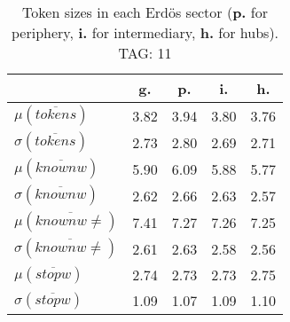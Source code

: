 \begin{table}[h!]
\begin{center}
\begin{tabular}{| l | c | c | c | c |}\hline
 & g. & p. & i. & h. \\\hline
$\mu(\overline{tokens})$ & 3.82  & 3.94  & 3.80  & 3.76 \\\hline
$\sigma(\overline{tokens})$ & 2.73  & 2.80  & 2.69  & 2.71 \\\hline
$\mu(\overline{knownw})$ & 5.90  & 6.09  & 5.88  & 5.77 \\\hline
$\sigma(\overline{knownw})$ & 2.62  & 2.66  & 2.63  & 2.57 \\\hline
$\mu(\overline{knownw \neq})$ & 7.41  & 7.27  & 7.26  & 7.25 \\\hline
$\sigma(\overline{knownw \neq})$ & 2.61  & 2.63  & 2.58  & 2.56 \\\hline
$\mu(\overline{stopw})$ & 2.74  & 2.73  & 2.73  & 2.75 \\\hline
$\sigma(\overline{stopw})$ & 1.09  & 1.07  & 1.09  & 1.10 \\\hline
\end{tabular}
\caption{Token sizes in each Erd\"os sector ({{\bf p.}} for periphery, {{\bf i.}} for intermediary, {{\bf h.}} for hubs). TAG: 11}
\end{center}
\end{table}